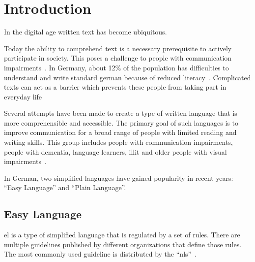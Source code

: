 \chapter{Introduction}\label{ch:introduction}

In the digital age written text has become ubiquitous. %

Today the ability to comprehend text is a necessary prerequisite to actively participate in society. %
This poses a challenge to people with communication impairments~\autocite{easyLanguageBook}.
In Germany, about 12\% of the population has difficulties to understand and write standard german because of reduced literacy~\autocite{schomacker2023data}.
Complicated texts can act as a barrier which prevents these people from taking part in everyday life~\autocite{easyLanguageBook}

Several attempts have been made to create a type of written language that is more comprehensible and accessible.
The primary goal of such languages is to improve communication for a broad range of people with limited reading and writing skills.
This group includes people with communication impairments, people with dementia, language learners, \gls{illit} and older people with visual impairments~\autocite{easyLanguageBook}.

In German, two simplified languages have gained popularity in recent years: \enquote{Easy Language} and \enquote{Plain Language}.



\section{Easy Language}\label{sec:el}

\gls{el} is a type of simplified language that is regulated by a set of rules.
There are multiple guidelines published by different organizations that define those rules.
The most commonly used guideline is distributed by the \enquote{\gls{nls}}~\autocite{netzwerkLS, easyLanguageBook}.

